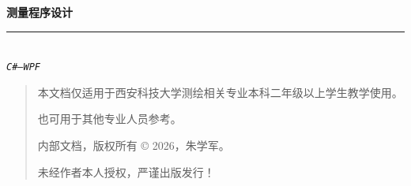 

\thispagestyle{empty}

\noindent
\begin{minipage}
{\textwidth}
\raggedleft
{\Huge \bfseries 测量程序设计}
\noindent\rule[-1ex]{\textwidth}{6pt}\\[2.5ex]
\hfill\emph{\huge  \texttt{C\#--WPF}}
\end{minipage}

\noindent{}


\newpage\thispagestyle{empty}
\begin{quote}\footnotesize
    本文档仅适用于西安科技大学测绘相关专业本科二年级以上学生教学使用。

    也可用于其他专业人员参考。

    内部文档，版权所有 \copyright{}  2026，朱学军。

    未经作者本人授权，严谨出版发行！
\end{quote}